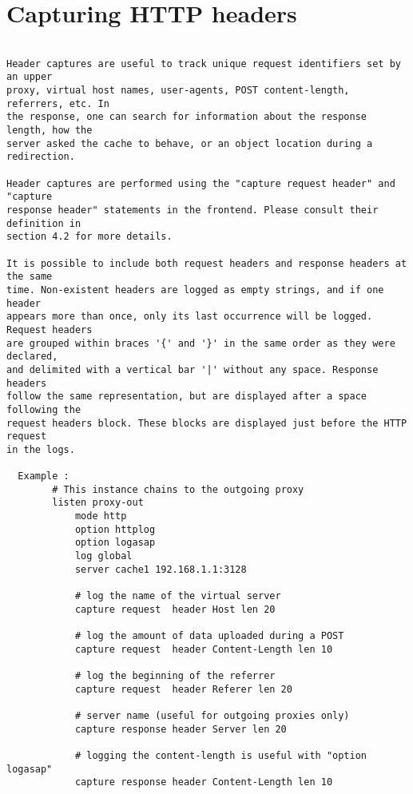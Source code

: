 
\section{Capturing HTTP headers}

\begin{verbatim}

Header captures are useful to track unique request identifiers set by an upper
proxy, virtual host names, user-agents, POST content-length, referrers, etc. In
the response, one can search for information about the response length, how the
server asked the cache to behave, or an object location during a redirection.

Header captures are performed using the "capture request header" and "capture
response header" statements in the frontend. Please consult their definition in
section 4.2 for more details.

It is possible to include both request headers and response headers at the same
time. Non-existent headers are logged as empty strings, and if one header
appears more than once, only its last occurrence will be logged. Request headers
are grouped within braces '{' and '}' in the same order as they were declared,
and delimited with a vertical bar '|' without any space. Response headers
follow the same representation, but are displayed after a space following the
request headers block. These blocks are displayed just before the HTTP request
in the logs.

  Example :
        # This instance chains to the outgoing proxy
        listen proxy-out
            mode http
            option httplog
            option logasap
            log global
            server cache1 192.168.1.1:3128

            # log the name of the virtual server
            capture request  header Host len 20

            # log the amount of data uploaded during a POST
            capture request  header Content-Length len 10

            # log the beginning of the referrer
            capture request  header Referer len 20

            # server name (useful for outgoing proxies only)
            capture response header Server len 20

            # logging the content-length is useful with "option logasap"
            capture response header Content-Length len 10


\end{verbatim}
